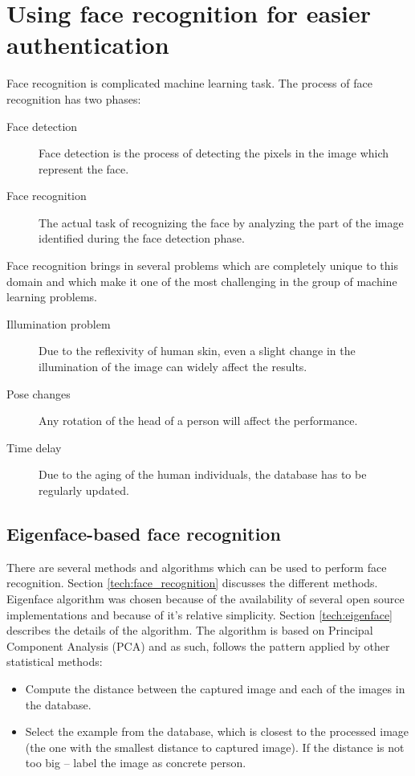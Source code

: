 \section {Using face recognition for easier authentication}
Face recognition is complicated machine learning task. The process of face recognition has two phases:

\begin{description}
	\item [Face detection] Face detection is the process of detecting the pixels in the image which represent the face. 
	\item [Face recognition] The actual task of recognizing the face by analyzing the part of the image identified during the face detection phase.
\end{description}

Face recognition brings in several problems which are completely unique to this domain and which make it one of the most challenging in the group of machine learning problems.

\begin{description}
	\item [Illumination problem] Due to the reflexivity of human skin, even a slight change in the illumination of the image can widely affect the results.
	\item [Pose changes] Any rotation of the head of a person will affect the performance.
	\item [Time delay] Due to the aging of the human individuals, the database has to be regularly updated.
\end{description}

\subsection{Eigenface-based face recognition}
There are several methods and algorithms which can be used to perform face recognition. Section \ref{tech:face_recognition} discusses the different methods. Eigenface algorithm was chosen because of the availability of several open source implementations and because of it's relative simplicity. Section \ref{tech:eigenface} describes the details of the algorithm.
The algorithm is based on Principal Component Analysis (PCA) and as such, follows the pattern applied by other statistical methods:

\begin{itemize}
	\item Compute the distance between the captured image and each of the images in the database.
	\item Select the example from the database, which is closest to the processed image (the one with the smallest distance to captured image). If the distance is not too big – label the image as concrete person. 	
\end{itemize}

